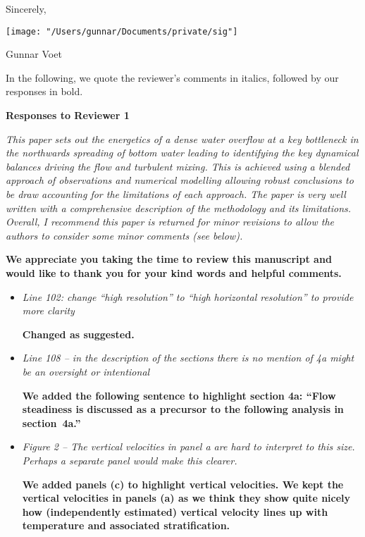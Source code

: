 \documentclass[11pt]{article}
\begin{document}
\begin{flushleft}
Sincerely,

\texttt{[image: "/Users/gunnar/Documents/private/sig"]}


Gunnar Voet

\clearpage
In the following, we quote the reviewer's comments in italics, followed by our responses in bold.\\
\vspace{0.2in}

\centerline{\bf Responses to Reviewer 1}
\vspace{0.05in}



\it
This paper sets out the energetics of a dense water overflow at a key bottleneck in the northwards spreading of bottom water leading to identifying the key dynamical balances driving the flow and turbulent mixing. This is achieved using a blended approach of observations and numerical modelling allowing robust conclusions to be draw accounting for the limitations of each approach. The paper is very well written with a comprehensive description of the methodology and its limitations. Overall, I recommend this paper is returned for minor revisions to allow the authors to consider some minor comments (see below).

\vspace{0.05in}
\bf
We appreciate you taking the time to review this manuscript and would like to thank you for your kind words and helpful comments.

\begin{itemize}
\item \it
Line 102: change ``high resolution'' to ``high horizontal resolution'' to provide more clarity

\bf
Changed as suggested.

\item \it
Line 108 -- in the description of the sections there is no mention of 4a might be an oversight or intentional

\bf
We added the following sentence to highlight section 4a: ``Flow steadiness is discussed as a precursor to the following analysis in section~4a.''

\item \it
Figure 2 -- The vertical velocities in panel a are hard to interpret to this size. Perhaps a separate panel would make this clearer.

\bf
We added panels (c) to highlight vertical velocities. We kept the vertical velocities in panels (a) as we think they show quite nicely how (independently estimated) vertical velocity lines up with temperature and associated stratification.


\end{itemize}
\end{flushleft}
\end{document}
